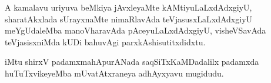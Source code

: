 \begin{mng}
A kamalavu uriyuva beMkiya jAvxleyaMte kAMtiyuLaLxdAdxgiyU, sharatAkxlada sUrayxnaMte nimaRlavAda teVjasusxLaLxdAdxgiyU meYgUdaleMba manoVharavAda pAceyuLaLxdAdxgiyU, visheVSavAda teVjasisxniMda kUDi bahuvAgi parxkAshisutitxdidxtu.
\end{mng}
iMtu shirxV padamxmahApurANada saqSiTxKaMDadalilx padamxda huTuTxvikeyeMba mUvatAtxraneya adhAyxyavu mugidudu.
